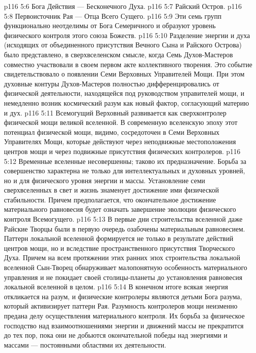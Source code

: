 \vs p116 5:6 \bibnobreakspace Бога Действия --- Бесконечного Духа.
\vs p116 5:7 \bibnobreakspace Райский Остров.
\vs p116 5:8 \bibnobreakspace Первоисточник Рая --- Отца Всего Сущего.
\vs p116 5:9 Эти семь групп функционально неотделимы от Бога Семеричного и образуют уровень физического контроля этого союза Божеств.
\vs p116 5:10 \pc Разделение энергии и духа (исходящих от объединенного присутствия Вечного Сына и Райского Острова) было представлено, в сверхвселенском смысле, когда Семь Духов\hyp{}Мастеров совместно участвовали в своем первом акте коллективного творения. Это событие свидетельствовало о появлении Семи Верховных Управителей Мощи. При этом духовные контуры Духов\hyp{}Мастеров полностью дифференцировались от физической деятельности, находящейся под руководством управителей мощи, и немедленно возник космический разум как новый фактор, согласующий материю и дух.
\vs p116 5:11 Всемогущий Верховный развивается как сверхконтролер физической мощи великой вселенной. В современную вселенскую эпоху этот потенциал физической мощи, видимо, сосредоточен в Семи Верховных Управителях Мощи, которые действуют через неподвижные местоположения центров мощи и через подвижные присутствия физических контролеров.
\vs p116 5:12 \pc Временные вселенные несовершенны; таково их предназначение. Борьба за совершенство характерна не только для интеллектуальных и духовных уровней, но и для физического уровня энергии и массы. Установление семи сверхвселенных в свет и жизнь знаменует достижение ими физической стабильности. Причем предполагается, что окончательное достижение материального равновесия будет означать завершение эволюции физического контроля Всемогущего.
\vs p116 5:13 В первые дни строительства вселенной даже Райские Творцы были в первую очередь озабочены материальным равновесием. Паттерн локальной вселенной формируется не только в результате действий центров мощи, но и вследствие пространственного присутствия Творческого Духа. Причем на всем протяжении этих ранних эпох строительства локальной вселенной Сын\hyp{}Творец обнаруживает малопонятную особенность материального управления и не покидает своей столицы\hyp{}планеты до установления равновесия локальной вселенной в целом.
\vs p116 5:14 \pc В конечном итоге всякая энергия откликается на разум, и физические контролеры являются детьми Бога разума, который активизирует паттерн Рая. Разумность контролеров мощи неизменно предана делу осуществления материального контроля. Их борьба за физическое господство над взаимоотношениями энергии и движений массы не прекратится до тех пор, пока они не добьются окончательной победы над энергиями и массами --- постоянными областями их деятельности.
